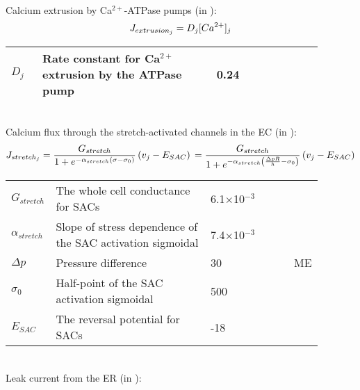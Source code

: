 \\
Calcium extrusion by Ca$^{2+}$-ATPase pumps (in \uMs):
\begin{equation} \label{eq:Jextrusionj}
J_{extrusion_{j}} = D_{j}[Ca^{2+}]_{j} 
\end{equation}
%
%
\begin{table}[h!]
\centering
\begin{tabular}{ p{0.09\linewidth}  >{\footnotesize} p{0.5\linewidth}  >{\footnotesize} p{0.27\linewidth} >{\footnotesize} p{0.03\linewidth} }
\hline
$D_{j}$      			& Rate constant for Ca$^{2+}$ extrusion by the ATPase pump		 & 0.24	\pers			& \cite{Koenigsberger2005} \\
\hline
\end{tabular}
\label{tab:Jextrusionj}
\end{table}
\\ 
Calcium flux through the stretch-activated channels in the EC (in \uMs): 
\begin{equation} \label{eq:Jstretchj}
J_{stretch_{j}}= \frac{G_{stretch}}{1+ e^{-\alpha_{stretch}  \left(  \sigma -\sigma_{0}   \right) }}  \left(  v_{j}-E_{SAC}   \right) \\
= \frac{G_{stretch}}{1+ e^{-\alpha_{stretch}  \left(  \frac{\Delta pR}{h} -\sigma_{0}   \right) }}  \left(  v_{j}-E_{SAC}   \right) 
\end{equation}
%
\begin{table}[h!]
\centering
\begin{tabular}{ p{0.09\linewidth}  >{\footnotesize} p{0.5\linewidth}  >{\footnotesize} p{0.27\linewidth} >{\footnotesize} p{0.03\linewidth} }
\hline
$G_{stretch}$      		& The whole cell conductance for SACs						& 6.1$\times$10$^{-3}$ \uMpmVs	&\cite{Koenigsberger2006} \\
$\alpha_{stretch}$      & Slope of stress dependence of the SAC activation sigmoidal	& 7.4$\times$10$^{-3}$ \pmmHg	&\cite{Koenigsberger2006} \\
$ \Delta p $			& Pressure difference										& 30 \mmHg			& ME \\
$\sigma_{0}$      		& Half-point of the SAC activation sigmoidal				& 500 \mmHg			&\cite{Koenigsberger2006} \\
$E_{SAC}$      			& The reversal potential for SACs							& -18 \mV			&\cite{Koenigsberger2006} \\
\hline
\end{tabular}
\label{tab:Jstretchj}
\end{table}
\\
%
Leak current from the ER (in \uMs):
